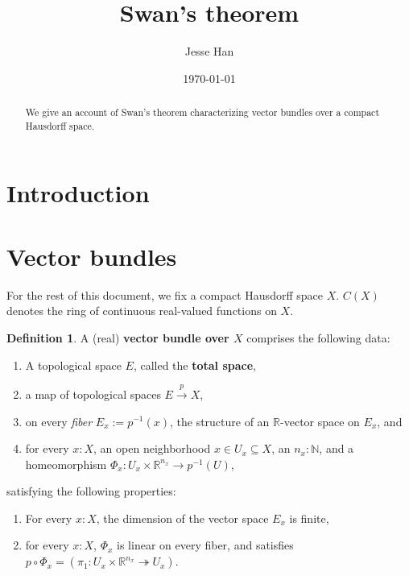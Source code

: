 \documentclass[11pt]{article}
\newcommand{\R}{\mathbb{R}}
\theoremstyle{plain}
\theoremstyle{definition}
\newtheorem{definition}{Definition}[section]
\newcommand{\N}{\mathbb{N}}
\begin{document}
\title{Swan's theorem}
\author{Jesse Han}
\date{\today}

\maketitle

\begin{abstract}
We give an account of Swan's theorem characterizing vector bundles over a compact Hausdorff space.
\end{abstract}

\section*{Introduction}

\section{Vector bundles}
For the rest of this document, we fix a compact Hausdorff space \(X\). \(C(X)\) denotes the ring of continuous real-valued functions on \(X\).
\begin{definition}

\label{def-vector-bundle}
 A (real) \textbf{vector bundle over \(X\)} comprises the following data:
  \begin{enumerate}[label={(\roman*)}]
  \item A topological space \(E\), called the \textbf{total space},
  \item a map of topological spaces \(E \overset{p}{\to} X\),
  \item on every \emph{fiber} \(E_x := p^{-1}(x)\), the structure of an \(\R\)-vector space on \(E_x\), and
  \item for every \(x : X\), an open neighborhood \(x \in U_x \subseteq X\), an \(n_x : \N\), and a homeomorphism \(\Phi_x : U_x \times \R^{n_x} \to p^{-1}(U)\),
  \end{enumerate}

  satisfying the following properties:
\begin{enumerate}[label={(\alph*)}]
  \item For every \(x : X\), the dimension of the vector space \(E_x\) is finite,
  \item \label{local-triviality} for every \(x : X\), \(\Phi_x\) is linear on every fiber, and satisfies \(p \circ \Phi_x = (\pi_1 : U_x \times \R^{n_x} \twoheadrightarrow U_x)\).
\end{enumerate}  
\end{definition}
\end{document}
